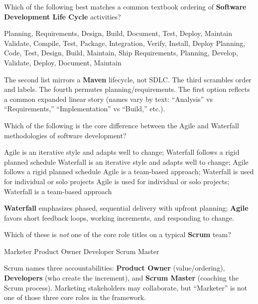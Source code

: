 \question[4]
Which of the following best matches a common textbook ordering of \textbf{Software Development Life Cycle} activities?
\begin{choices}
  \CorrectChoice Planning, Requirements, Design, Build, Document, Test, Deploy, Maintain
  \choice Validate, Compile, Test, Package, Integration, Verify, Install, Deploy
  \choice Planning, Code, Test, Design, Build, Maintain, Ship
  \choice Requirements, Planning, Develop, Validate, Deploy, Document, Maintain
\end{choices}
\begin{solution}
  The second list mirrors a \textbf{Maven} lifecycle, not SDLC. The third scrambles order and labels. The fourth permutes planning/requirements. The first option reflects a common expanded linear story (names vary by text: ``Analysis'' vs ``Requirements,'' ``Implementation'' vs ``Build,'' etc.).
\end{solution}

\question[4]
Which of the following is the core difference between the Agile and Waterfall methodologies of software development?
\begin{choices}
  \CorrectChoice Agile is an iterative style and adapts well to change; Waterfall follows a rigid planned schedule
  \choice Waterfall is an iterative style and adapts well to change; Agile follows a rigid planned schedule
  \choice Agile is a team-based approach; Waterfall is used for individual or solo projects
  \choice Agile is used for individual or solo projects; Waterfall is a team-based approach
\end{choices}
\begin{solution}
  \textbf{Waterfall} emphasizes phased, sequential delivery with upfront planning; \textbf{Agile} favors short feedback loops, working increments, and responding to change.
\end{solution}

\newpage


\question[4]
Which of these is \emph{not} one of the core role titles on a typical \textbf{Scrum} team?
\begin{choices}
  \CorrectChoice Marketer
  \choice Product Owner
  \choice Developer
  \choice Scrum Master
\end{choices}
\begin{solution}
  Scrum names three accountabilities: \textbf{Product Owner} (value/ordering), \textbf{Developers} (who create the increment), and \textbf{Scrum Master} (coaching the Scrum process). Marketing stakeholders may collaborate, but ``Marketer'' is not one of those three core roles in the framework.
\end{solution}

